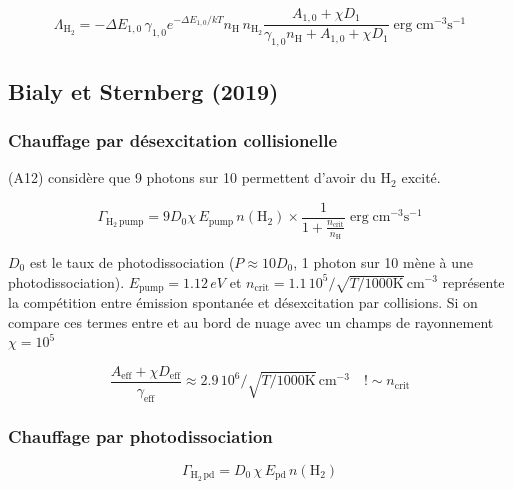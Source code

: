 \begin{equation}
    \Lambda_{\mathrm{H}_2} = - \Delta E_{1,0} \, \gamma_{1,0} e^{-\Delta E_{1,0}/kT} n_{\mathrm{H}} \, n_{\mathrm{H}_2} \frac{A_{1,0} + \chi D_1}{\gamma_{1,0}  n_{\mathrm{H}} + A_{1,0} + \chi D_1} \operatorname{erg} \mathrm{cm}^{-3} \mathrm{s}^{-1}
\end{equation}

\subsection{Bialy et Sternberg (2019)}
\subsubsection{Chauffage par désexcitation collisionelle}

\cite{BialySternberg_2019} (A12) considère que 9 photons sur 10 permettent d'avoir du $\mathrm{H}_2$ excité. 

\begin{equation}
    \Gamma_{\mathrm{H}_2 \, \mathrm{pump}} = 9D_0 \chi \, E_{\mathrm{pump}} \, n(\mathrm{H}_2) \times \frac{1}{1 + \frac{n_{\mathrm{crit}}}{n_\mathrm{H}} } \operatorname{erg} \mathrm{cm}^{-3} \mathrm{s}^{-1}
\end{equation}

$D_0$ est le taux de photodissociation ($P \approx 10 D_0$, 1 photon sur 10 mène à une photodissociation). $E_{\mathrm{pump}} = 1.12\,eV$ et $n_{\mathrm{crit}} = 1.1\,10^5 /\sqrt{T/1000\mathrm{K}} \, \mathrm{cm}^{-3}$ représente la compétition entre émission spontanée et désexcitation par collisions. Si on compare ces termes entre \cite{BialySternberg_2019} et \cite{Rollig2005} au bord de nuage avec un champs de rayonnement $\chi = 10^5 $

\begin{equation}
    \frac{A_{\text{eff}}+ \chi D_{\text{eff}}}{\gamma_{\text{eff}}} \approx 2.9\,10^{6} /\sqrt{T/1000\mathrm{K}} \, \mathrm{cm}^{-3} \quad !\sim n_{\mathrm{crit}}
\end{equation}

\subsubsection{Chauffage par photodissociation}

\begin{equation}
    \Gamma_{\mathrm{H}_2 \, \mathrm{pd}} = D_0\,\chi \, E_\mathrm{pd} \, n(\mathrm{H}_2)
\end{equation}

